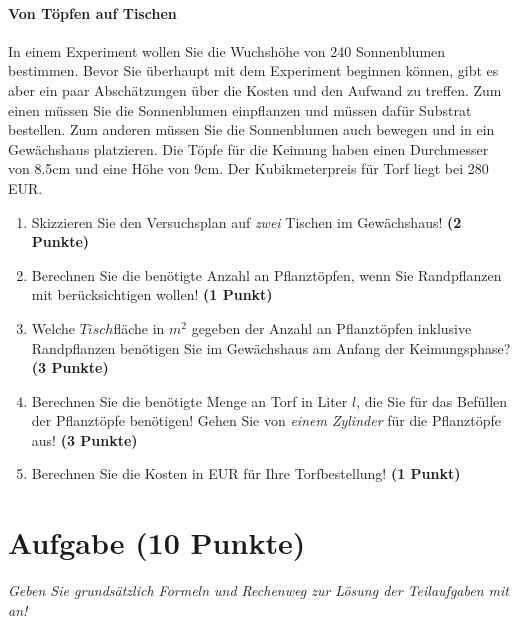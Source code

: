 \documentclass[a4paper, 9pt]{scrartcl}\usepackage[]{graphicx}\usepackage[]{xcolor}
\begin{document}
\paragraph{Von T{\"o}pfen auf Tischen}



In einem Experiment wollen Sie die Wuchsh{\"o}he von 240
Sonnenblumen bestimmen. Bevor Sie {\"u}berhaupt mit dem Experiment beginnen
k{\"o}nnen, gibt es aber ein paar Absch{\"a}tzungen {\"u}ber die Kosten und den Aufwand
zu treffen. Zum einen m{\"u}ssen Sie die Sonnenblumen einpflanzen und m{\"u}ssen
daf{\"u}r Substrat bestellen. Zum anderen m{\"u}ssen Sie die Sonnenblumen auch
bewegen und in ein Gew{\"a}chshaus platzieren. Die T{\"o}pfe f{\"u}r die Keimung haben
einen Durchmesser von 8.5cm und eine H{\"o}he von 9cm. Der
Kubikmeterpreis f{\"u}r Torf liegt bei 280 EUR.

\begin{enumerate}
\item Skizzieren Sie den Versuchsplan auf \textit{zwei} Tischen im
  Gew{\"a}chshaus! \textbf{(2 Punkte)}
\item Berechnen Sie die ben{\"o}tigte Anzahl an Pflanzt{\"o}pfen, wenn Sie
  Randpflanzen mit ber{\"u}cksichtigen wollen! \textbf{(1 Punkt)}
\item Welche $Tisch$fl{\"a}che in $m^2$ gegeben der Anzahl an
  Pflanzt{\"o}pfen inklusive Randpflanzen ben{\"o}tigen Sie im Gew{\"a}chshaus am
  Anfang der Keimungsphase?  \textbf{(3 Punkte)}
\item Berechnen Sie die ben{\"o}tigte Menge an Torf in Liter $l$, die Sie f{\"u}r
  das Bef{\"u}llen der Pflanzt{\"o}pfe ben{\"o}tigen! Gehen Sie von \textit{einem
    Zylinder} f{\"u}r die Pflanzt{\"o}pfe aus!  \textbf{(3 Punkte)}
\item Berechnen Sie die Kosten in EUR f{\"u}r Ihre Torfbestellung! \textbf{(1
    Punkt)}
\end{enumerate}



 
\clearpage

\section{Aufgabe \hfill (10 Punkte)}

\textit{Geben Sie grunds{\"a}tzlich Formeln und Rechenweg zur L{\"o}sung der
  Teilaufgaben mit an!} \\[1Ex]
\end{document}
